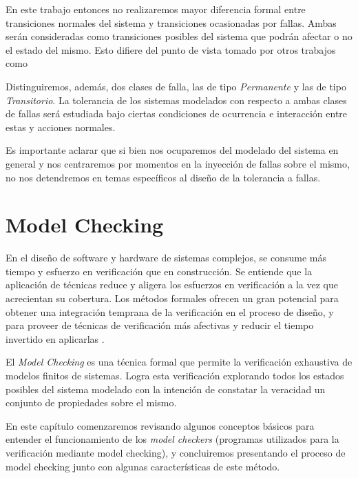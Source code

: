 \documentclass[pdftex,a4paper,12pt]{book}
\begin{document}
En este trabajo entonces no realizaremos mayor diferencia formal entre transiciones normales del sistema y transiciones ocasionadas por fallas. Ambas ser\'an consideradas como transiciones posibles del sistema que podr\'an afectar o no el estado del mismo. Esto difiere del punto de vista tomado por otros trabajos como \cite[etc...]{Arora,dCTL}

Distinguiremos, adem\'as, dos clases de falla, las de tipo \textit{Permanente} y las de tipo \textit{Transitorio}. La tolerancia de los sistemas modelados con respecto a ambas clases de fallas ser\'a estudiada bajo ciertas condiciones de ocurrencia e interacci\'on entre estas y acciones normales.

Es importante aclarar que si bien nos ocuparemos del modelado del sistema en general y nos centraremos por momentos en la inyecci\'on de fallas sobre el mismo, no nos detendremos en temas espec\'ificos al dise\~no de la tolerancia a fallas.











\chapter{Model Checking}
\label{CapMC}

En el dise\~no de software y hardware de sistemas complejos, se consume m\'as tiempo y esfuerzo en verificaci\'on que en construcci\'on. Se entiende que la aplicaci\'on de t\'ecnicas reduce y aligera los esfuerzos en verificaci\'on a la vez que acrecientan su cobertura. Los m\'etodos formales ofrecen un gran potencial para obtener una integraci\'on temprana de la verificaci\'on en el proceso de dise\~no, y para proveer de t\'ecnicas de verificaci\'on m\'as afectivas y reducir el tiempo invertido en aplicarlas \cite{Baier}.

El \textit{Model Checking} es una t\'ecnica formal que permite la verificaci\'on exhaustiva de modelos finitos de sistemas. Logra esta verificaci\'on explorando todos los estados posibles del sistema modelado con la intenci\'on de constatar la veracidad un conjunto de propiedades sobre el mismo.

En este cap\'itulo comenzaremos revisando algunos conceptos b\'asicos para entender el funcionamiento de los \textit{model checkers} (programas utilizados para la verificaci\'on mediante model checking), y concluiremos presentando el proceso de model checking junto con algunas caracter\'isticas de este m\'etodo.
\end{document}
